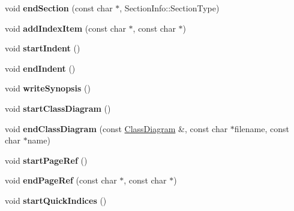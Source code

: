 \begin{DoxyCompactItemize}
\item 
\hypertarget{class_r_t_f_generator_ab32c634e6ee9223b4c5d77b1e3d8c082}{void {\bfseries end\-Section} (const char $\ast$, Section\-Info\-::\-Section\-Type)}\label{class_r_t_f_generator_ab32c634e6ee9223b4c5d77b1e3d8c082}

\item 
\hypertarget{class_r_t_f_generator_a6a680849ac320b2cbb670773aa5c9feb}{void {\bfseries add\-Index\-Item} (const char $\ast$, const char $\ast$)}\label{class_r_t_f_generator_a6a680849ac320b2cbb670773aa5c9feb}

\item 
\hypertarget{class_r_t_f_generator_a34fb23b9705fd9c97bfb8730b5667822}{void {\bfseries start\-Indent} ()}\label{class_r_t_f_generator_a34fb23b9705fd9c97bfb8730b5667822}

\item 
\hypertarget{class_r_t_f_generator_a3e925c49464a35005365e14899e6c0a8}{void {\bfseries end\-Indent} ()}\label{class_r_t_f_generator_a3e925c49464a35005365e14899e6c0a8}

\item 
\hypertarget{class_r_t_f_generator_acba0caaf7ea5f4acb9b4bf3ccbf2ee68}{void {\bfseries write\-Synopsis} ()}\label{class_r_t_f_generator_acba0caaf7ea5f4acb9b4bf3ccbf2ee68}

\item 
\hypertarget{class_r_t_f_generator_ab9f199144725218464219039e2e7284e}{void {\bfseries start\-Class\-Diagram} ()}\label{class_r_t_f_generator_ab9f199144725218464219039e2e7284e}

\item 
\hypertarget{class_r_t_f_generator_a235af3c7f2b84efa908cd8a2f8328b8c}{void {\bfseries end\-Class\-Diagram} (const \hyperlink{class_class_diagram}{Class\-Diagram} \&, const char $\ast$filename, const char $\ast$name)}\label{class_r_t_f_generator_a235af3c7f2b84efa908cd8a2f8328b8c}

\item 
\hypertarget{class_r_t_f_generator_acb1f8019fc7ab54bdba19c92ef4a223d}{void {\bfseries start\-Page\-Ref} ()}\label{class_r_t_f_generator_acb1f8019fc7ab54bdba19c92ef4a223d}

\item 
\hypertarget{class_r_t_f_generator_a0e845e76703cf2a22b8c801febfe14c8}{void {\bfseries end\-Page\-Ref} (const char $\ast$, const char $\ast$)}\label{class_r_t_f_generator_a0e845e76703cf2a22b8c801febfe14c8}

\item 
\hypertarget{class_r_t_f_generator_a1003d38afed51e3e932a61be3b2d71a4}{void {\bfseries start\-Quick\-Indices} ()}\label{class_r_t_f_generator_a1003d38afed51e3e932a61be3b2d71a4}


\end{DoxyCompactItemize}
